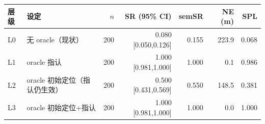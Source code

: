 \begin{tabular}{llrrrrr}
\hline
层级 & 设定 & $n$ & SR (95\% CI) & semSR & NE (m) & SPL \\
\hline
L0 & 无 oracle（现状） & 200 & 0.080 [0.050,0.126] & 0.155 & 223.9 & 0.068 \\
L1 & oracle 指认 & 200 & 1.000 [0.981,1.000] & 1.000 & 0.1 & 0.986 \\
L2 & oracle 初始定位（指认仍生效） & 200 & 0.500 [0.431,0.569] & 0.550 & 148.5 & 0.381 \\
L3 & oracle 初始定位+指认 & 200 & 1.000 [0.981,1.000] & 1.000 & 0.0 & 1.000 \\
\hline
\end{tabular}
